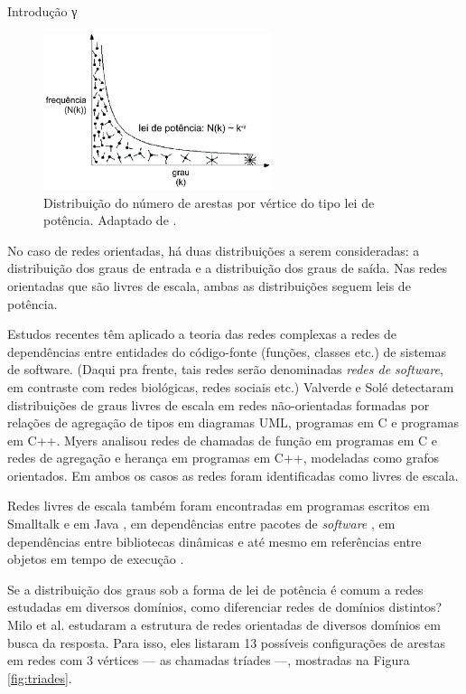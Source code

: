 \begin{section}{Introdução}
γ
\begin{figure}[htbp]
	\centering
	\includegraphics[width=0.6\textwidth]{figuras/leidepotencia}
	\caption{Distribuição do número de arestas por vértice do tipo lei de potência. Adaptado de \cite{Barabasi2007}.}
	\label{fig:leidepotencia}
\end{figure}

No caso de redes orientadas, há duas distribuições a serem consideradas: a distribuição dos graus de entrada e a distribuição dos graus de saída. Nas redes orientadas que são livres de escala, ambas as distribuições seguem leis de potência.

Estudos recentes têm aplicado a teoria das redes complexas a redes de dependências entre entidades do código-fonte (funções, classes etc.) de sistemas de software. (Daqui pra frente, tais redes serão denominadas \emph{redes de software}, em contraste com redes biológicas, redes sociais etc.) Valverde e Solé \cite{Valverde2003} detectaram distribuições de graus livres de escala em redes não-orientadas formadas por relações de agregação de tipos em diagramas UML, programas em C e programas em C++. Myers \cite{Myers2003} analisou redes de chamadas de função em programas em C e redes de agregação e herança em programas em C++, modeladas como grafos orientados. Em ambos os casos as redes foram identificadas como livres de escala. 

Redes livres de escala também foram encontradas em programas escritos em Smalltalk \cite{Marchesi2004,Concas2007} e em Java \cite{Hyland-Wood2006,Baxter2006,Ichii2008}, em dependências entre pacotes de \textit{software} \cite{Labelle2004}, em dependências entre bibliotecas dinâmicas \cite{Louridas2008} e até mesmo em referências entre objetos em tempo de execução \cite{Potanin2005}.

Se a distribuição dos graus sob a forma de lei de potência é comum a redes estudadas em diversos domínios, como diferenciar redes de domínios distintos? Milo et al. \cite{Milo2002} estudaram a estrutura de redes orientadas de diversos domínios em busca da resposta. Para isso, eles listaram 13 possíveis configurações de arestas em redes com 3 vértices --- as chamadas tríades ---, mostradas na Figura \ref{fig:triades}.


\end{section}
